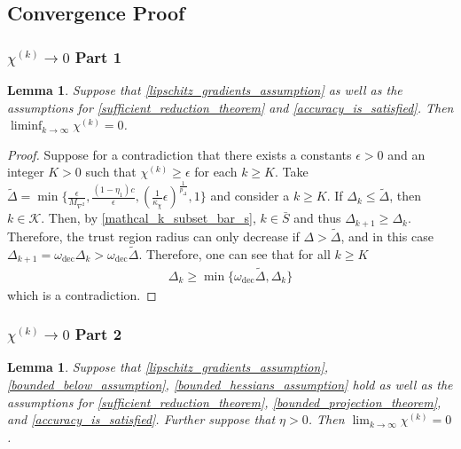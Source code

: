 \documentclass{article}
\newtheorem{lemma}[theorem]{Lemma}
\theoremstyle{case}
\newcommand{\maxhessian}{{M_{\nabla^2}}}
\newcommand{\dk}{\Delta_k}
\newcommand{\chik}{{\chi^{(k)}}}
\newcommand{\omegadec}{\omega_{\text{dec}}}
\newcommand{\dkpo}{\Delta_{k+1}}
\begin{document}
\subsection{Convergence Proof}
\subsubsection{$\chik \to 0$ Part 1}
\begin{lemma}
\label{liminf_chi_to_zero}
Suppose that \cref{lipschitz_gradients_assumption} as well as the assumptions for \cref{sufficient_reduction_theorem} and \cref{accuracy_is_satisfied}.
Then $\liminf_{k\to\infty} \chik = 0$.
\end{lemma}
 

\begin{proof}
Suppose for a contradiction that there exists a constants $\epsilon > 0$ and an integer $K > 0$ such that $\chik \ge \epsilon$ for each $k \ge K$.
Take $ \tilde \Delta = \min \{\frac{\epsilon}{\maxhessian}, \frac{(1 - \eta_1)c}{\epsilon}, \left(\frac 1 {\kappa_{\chi}}  \epsilon \right)^{\frac 1 {p_{\Delta}}}, 1\}$
and consider a $k \ge K$.
If $\dk \le \tilde \Delta$, then $k \in \mathcal K$.
Then, by \cref{mathcal_k_subset_bar_s},  $k \in \bar S$ and thus $\dkpo \ge \dk$.
Therefore, the trust region radius can only decrease if $\Delta > \tilde \Delta$, and in this case $\dkpo = \omegadec\dk > \omegadec \tilde \Delta$.
Therefore, one can see that for all $k \ge K$
\begin{align}
\dk \ge \min\{\omegadec \tilde \Delta, \dk \}
\end{align}
which is a contradiction.
\end{proof}



\subsubsection{$\chik \to 0$ Part 2}
\begin{lemma}
\label{lim_chi_to_zero}
Suppose that \cref{lipschitz_gradients_assumption}, \cref{bounded_below_assumption}, \cref{bounded_hessians_assumption} hold as well as the assumptions for 
\cref{sufficient_reduction_theorem}, \cref{bounded_projection_theorem}, and \cref{accuracy_is_satisfied}.
Further suppose that $\eta > 0$.
Then $\lim_{k\to\infty}\chik=0$.
\end{lemma}
\end{document}

